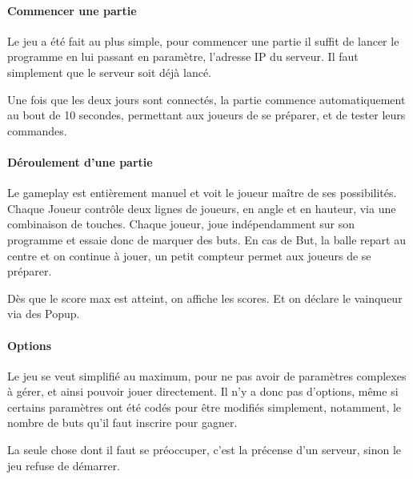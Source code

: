 \documentclass[a4paper,12pt]{report}
\begin{document}
\paragraph{Commencer une partie}

Le jeu a été fait au plus simple, pour commencer une partie il suffit de lancer le programme en lui passant en paramètre, l'adresse IP du serveur. Il faut simplement que le serveur soit déjà lancé.

Une fois que les deux jours sont connectés, la partie commence automatiquement au bout de 10 secondes, permettant aux joueurs de se préparer, et de tester leurs commandes.




\paragraph{Déroulement d'une partie}

Le gameplay est entièrement manuel et voit le joueur maître de ses possibilités. Chaque Joueur contrôle deux lignes de joueurs, en angle et en hauteur, via une combinaison de touches. Chaque joueur, joue indépendamment sur son programme et essaie donc de marquer des buts. En cas de But, la balle repart au centre et on continue à jouer, un petit compteur permet aux joueurs de se préparer.




Dès que le score max est atteint, on affiche les scores. Et on déclare le vainqueur via des Popup.

\paragraph{Options}

Le jeu se veut simplifié au maximum, pour ne pas avoir de paramètres complexes à gérer, et ainsi pouvoir jouer directement. Il n'y a donc pas d'options, même si certains paramètres ont été codés pour être modifiés simplement, notamment, le nombre de buts qu'il faut inscrire pour gagner.

La seule chose dont il faut se préoccuper, c'est la précense d'un serveur, sinon le jeu refuse de démarrer.









\end{document}
